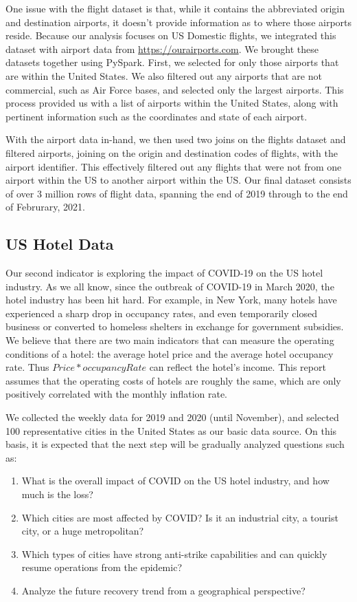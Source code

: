 \documentclass[sigconf, nonacm]{acmart}
\begin{document}
One issue with the flight dataset is that, while it contains the abbreviated origin and destination airports, it doesn't provide information as to where those airports reside. Because our analysis focuses on US Domestic flights, we integrated this dataset with airport data from \url{https://ourairports.com}. We brought these datasets together using PySpark. First, we selected for only those airports that are within the United States. We also filtered out any airports that are not commercial, such as Air Force bases, and selected only the largest airports. This process provided us with a list of airports within the United States, along with pertinent information such as the coordinates and state of each airport.

With the airport data in-hand, we then used two joins on the flights dataset and filtered airports, joining on the origin and destination codes of flights, with the airport identifier. This effectively filtered out any flights that were not from one airport within the US to another airport within the US. Our final dataset consists of over 3 million rows of flight data, spanning the end of 2019 through to the end of Februrary, 2021.

\subsection{US Hotel Data}

Our second indicator is exploring the impact of COVID-19 on the US hotel industry. As we all know, since the outbreak of COVID-19 in March 2020, the hotel industry has been hit hard. For example, in New York, many hotels have experienced a sharp drop in occupancy rates, and even temporarily closed business or converted to homeless shelters in exchange for government subsidies. We believe that there are two main indicators that can measure the operating conditions of a hotel: the average hotel price and the average hotel occupancy rate. Thus $Price*occupancyRate$ can reflect the hotel’s income. This report assumes that the operating costs of hotels are roughly the same, which are only positively correlated with the monthly inflation rate.

We collected the weekly data for 2019 and 2020 (until November), and selected 100 representative cities in the United States as our basic data source. On this basis, it is expected that the next step will be gradually analyzed questions such as:

\begin{enumerate}
  \item  What is the overall impact of COVID on the US hotel industry, and how much is the loss?
  \item Which cities are most affected by COVID? Is it an industrial city, a tourist city, or a huge metropolitan?
  \item Which types of cities have strong anti-strike capabilities and can quickly resume operations from the epidemic?
  \item Analyze the future recovery trend from a geographical perspective?
\end{enumerate}
\end{document}
